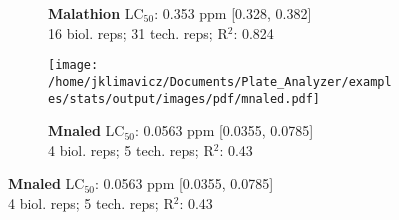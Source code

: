 \documentclass{article}
\begin{document}
\begin{figure}[thp!]
\begin{subfigure}{0.500\textwidth}
      \vspace{-0.05cm}
      \caption*{\textbf{Malathion} LC$_{50}$: 0.353 ppm [0.328, 0.382] \\ 
16 biol. reps; 31 tech. reps; R$^2$: 0.824}
      \vspace{0.1cm}
   \end{subfigure}%
   \begin{subfigure}{0.500\textwidth}
      \centering
      \texttt{[image: /home/jklimavicz/Documents/Plate\_Analyzer/examples/stats/output/images/pdf/mnaled.pdf]}
      \vspace{-0.05cm}
      \caption*{\textbf{Mnaled} LC$_{50}$: 0.0563 ppm [0.0355, 0.0785] \\ 
4 biol. reps; 5 tech. reps; R$^2$: 0.43}
      \vspace{0.1cm}
   \end{subfigure}%
\end{figure}
\clearpage
\pagebreak
\vspace{-0.1cm}
\end{document}
